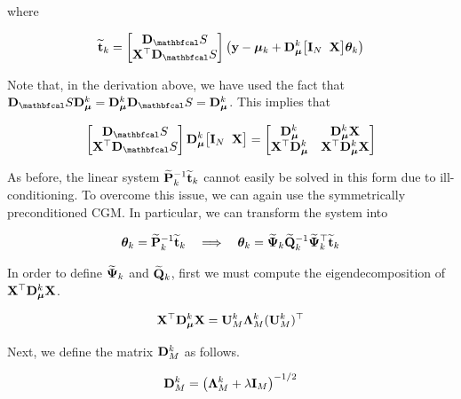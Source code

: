 where 

\begin{equation}
    \widetilde{\tee}_k = \begin{bmatrix}
        \D_\St \\ \X^\top \D_\St
    \end{bmatrix} \left(\y - \muu_k + \D_{\muu}^k \big[\I_N \;\; \X \big] \thetaa_k \right)
\end{equation}

Note that, in the derivation above, we have used the fact that $\D_\St \D_{\muu}^k = \D_{\muu}^k \D_\St = \D_{\muu}^k$. This implies that 

\begin{equation*}
    \begin{bmatrix}
        \D_\St \\ \X^\top \D_\St
    \end{bmatrix} \D_{\muu}^k \big[\I_N \;\; \X \big] =  \begin{bmatrix}
        \D_{\muu}^k & \D_{\muu}^k \X \\ 
        \X^\top \D_{\muu}^k  & \X^\top \D_{\muu}^k \X
    \end{bmatrix}
\end{equation*}

As before, the linear system $\widetilde{\mathbf{P}}_k^{-1} \widetilde{\mathbf{t}}_k $ cannot easily be solved in this form due to ill-conditioning. To overcome this issue, we can again use the symmetrically preconditioned CGM. In particular, we can transform the system into 

\begin{equation*}
    \boldsymbol{\theta}_k = \widetilde{\mathbf{P}}^{-1}_k \widetilde{\mathbf{t}}_k \quad \Longrightarrow \quad \boldsymbol{\theta}_k = \widetilde{\mathbf{\Psi}}_k \widetilde{\mathbf{Q}}_k^{-1} \widetilde{\mathbf{\Psi}}_k^\top \widetilde{\mathbf{t}}_k
\end{equation*}

In order to define $\widetilde{\mathbf{\Psi}}_k$ and $\widetilde{\mathbf{Q}}_k$, first we must compute the eigendecomposition of $\mathbf{X}^\top \mathbf{D}_{\boldsymbol{\mu}}^k \mathbf{X}$. 

\begin{equation}
    \mathbf{X}^\top \mathbf{D}_{\boldsymbol{\mu}}^k \mathbf{X} = \mathbf{U}_M^k \mathbf{\Lambda}_M^k (\mathbf{U}_M^k)^\top 
\end{equation}

Next, we define the matrix $\mathbf{D}_M^k$ as follows. 

\begin{equation}
    \mathbf{D}_M^k = \left(\mathbf{\Lambda}_M^k + \lambda \mathbf{I}_M\right)^{-1/2}
\end{equation}

